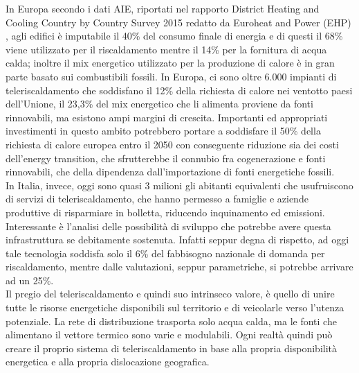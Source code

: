 \documentclass[laurea,oneside,11pt]{USiena_tesiLM}
\begin{document}
In Europa secondo i dati AIE, riportati nel rapporto District Heating and Cooling Country by Country Survey 2015 redatto da Euroheat and Power (EHP) \cite{heating2015cooling}, agli edifici è imputabile il 40\% del consumo finale di energia e di questi il 68\% viene utilizzato per il riscaldamento mentre il 14\% per la fornitura di acqua calda; inoltre il mix energetico utilizzato per la produzione di calore è in gran parte basato sui combustibili fossili. In Europa, ci sono oltre 6.000 impianti di teleriscaldamento che soddisfano il 12\% della richiesta di calore nei ventotto paesi dell'Unione, il 23,3\% del mix energetico che li alimenta proviene da fonti rinnovabili, ma esistono ampi margini di crescita. Importanti ed appropriati investimenti in questo ambito potrebbero portare a soddisfare il 50\% della richiesta di calore europea entro il 2050 con conseguente riduzione sia dei costi dell'energy transition, che sfrutterebbe il connubio fra cogenerazione e fonti rinnovabili, che della dipendenza dall'importazione di fonti energetiche fossili.\\

In Italia, invece, oggi sono quasi 3 milioni gli abitanti equivalenti che usufruiscono di servizi di teleriscaldamento, che hanno permesso a famiglie e aziende produttive di risparmiare in bolletta, riducendo inquinamento ed emissioni. 
Interessante è l'analisi delle possibilità di sviluppo che potrebbe avere questa infrastruttura se debitamente sostenuta. Infatti seppur degna di rispetto, ad oggi tale tecnologia soddisfa solo il 6\% del fabbisogno nazionale di domanda per riscaldamento, mentre dalle valutazioni, seppur parametriche, si potrebbe arrivare ad un 25\%.\\

 Il pregio del teleriscaldamento e quindi suo intrinseco valore, è quello di unire tutte le risorse energetiche disponibili sul territorio e di veicolarle verso l'utenza potenziale. La rete di distribuzione trasporta solo acqua calda, ma le fonti che alimentano il vettore termico sono varie e modulabili. Ogni realtà quindi può creare il proprio sistema di teleriscaldamento in base alla propria disponibilità energetica e alla propria dislocazione geografica.
\end{document}
